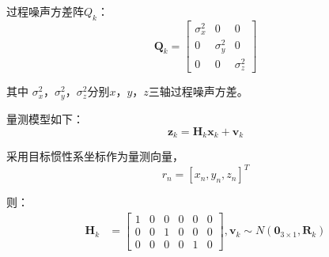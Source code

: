过程噪声方差阵$Q_k$：
\begin{equation} \boldsymbol Q_k =\left[\begin{array}{ccc} \sigma_x^2 &  0 & 0 \\ 0 &  \sigma_y^2 & 0 \\ 0 & 0 & \sigma_z^2 \end{array}\right] \end{equation}
\par
其中 $\sigma_x^2$，$\sigma_y ^2$，$\sigma_z^2$分别$x$，$y$，$z$三轴过程噪声方差。
\par


量测模型如下：\begin{equation} \boldsymbol  z_{k} = \boldsymbol H_k\boldsymbol x_k + \boldsymbol {v}_{k} \end{equation}
\par
采用目标惯性系坐标作为量测向量，\begin{equation} r_n = [x_n,y_n,z_n]^T \end{equation} 
\par
则：
\begin{equation} \begin{aligned} \boldsymbol H_k &=  \left[\begin{array}{cccccc} 1 & 0 &0 &0 &  0 &0   \\ 0 &0 &1 &0 &0 &0 \\ 0 &0 &0 &0 &1 &0  \end{array}\right],\boldsymbol {v}_{k} \sim N\left(\boldsymbol 0_{3 \times 1}, \boldsymbol {R}_k\right) \end{aligned} \end{equation}
\par

